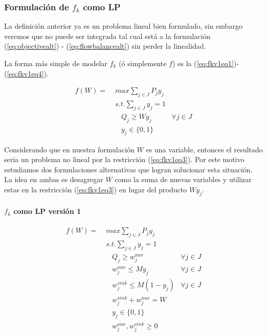 \documentclass{article}
\begin{document}
  \subsubsection{Formulación de $f_k$ como LP}

  La definición anterior ya es un problema lineal bien formulado, sin embargo veremos que no puede ser integrada tal cual está a la formulación (\ref{eq:objectivealt}) - (\ref{eq:flowbalancealt}) sin perder la linealidad.

  La forma más simple de modelar $f_k$ (ó simplemente $f$) es la (\ref{eq:fkv1eq1})-(\ref{eq:fkv1eq4}).

  \begin{align}
    f(W) =\; & max \sum_{j \in J} P_j y_j    & \label{eq:fkv1eq1}\\
             & s.t. \sum_{j \in J} y_j = 1   & \label{eq:fkv1eq2} \\
             & \;\;\; Q_j \geq W y_j         & \label{eq:fkv1eq3} \forall j \in J \\
             & \;\;\; y_j \in \{0,1\}        & \label{eq:fkv1eq4}
  \end{align}

  Considerando que en nuestra formulación $W$ es una variable, entonces el resultado seria un problema no lineal por la restricción (\ref{eq:fkv1eq3}). Por este motivo estudiamos dos formulaciones alternativas que logran solucionar esta situación. La idea en ambas es desagregar $W$ como la suma de nuevas variables y utilizar estas en la restricción (\ref{eq:fkv1eq3}) en lugar del producto $W y_j$.

  \paragraph*{$f_k$ como LP versión 1}

  \begin{align}
    f(W) =\; & max \sum_{j \in J} P_j y_j             & \label{eq:fkv3eq1}\\
             & s.t. \sum_{j \in J} y_j = 1            & \label{eq:fkv3eq2}\\
             & \;\;\; Q_j \geq w^{aux}_j              & \forall j \in J \label{eq:fkv3eq3} \\
             & \;\;\; w^{aux}_j \leq M y_j            & \forall j \in J \label{eq:fkv3eq4} \\
             & \;\;\; w^{sink}_j \leq M (1 - y_j)     & \forall j \in J \label{eq:fkv3eq5} \\
             & \;\;\; w^{sink}_j + w^{aux}_j = W      & \label{eq:fkv3eq6} \\
             & \;\;\; y_j \in \{0,1\}                 & \label{eq:fkv3domainy} \\
             & \;\;\; w^{aux}_j, w^{sink}_j \geq 0    & \label{eq:fkv3eq7}
  \end{align}
\end{document}
